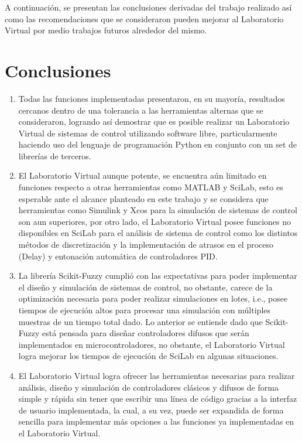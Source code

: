 A continuación, se presentan las conclusiones derivadas del trabajo realizado así como las recomendaciones que se consideraron pueden mejorar al Laboratorio Virtual por medio trabajos futuros alrededor del mismo.

\section{Conclusiones}

    \begin{enumerate}[leftmargin=15pt]
        \setlength\itemsep{10pt}    
        \item Todas las funciones implementadas presentaron, en su mayoría, resultados cercanos dentro de una tolerancia a las herramientas alternas que se consideraron, logrando así demostrar que es posible realizar un Laboratorio Virtual de sistemas de control utilizando software libre, particularmente haciendo uso del lenguaje de programación Python en conjunto con un set de librerías de terceros.
        
        \item El Laboratorio Virtual aunque potente, se encuentra aún limitado en funciones respecto a otras herramientas como MATLAB y SciLab, esto es esperable ante el alcance planteado en este trabajo y se considera que herramientas como Simulink y Xcos para la simulación de sistemas de control son aun superiores, por otro lado, el Laboratorio Virtual posee funciones no disponibles en SciLab para el análisis de sistema de control como los distintos métodos de discretización y la implementación de atrasos en el proceso (Delay) y entonación automática de controladores PID.
        
        \item La librería Scikit-Fuzzy cumplió con las expectativas para poder implementar el diseño y simulación de sistemas de control, no obstante, carece de la optimización necesaria para poder realizar simulaciones en lotes, i.e., posee tiempos de ejecución altos para procesar una simulación con múltiples muestras de un tiempo total dado. Lo anterior se entiende dado que Scikit-Fuzzy está pensada para diseñar controladores difusos que serán implementados en microcontroladores, no obstante, el Laboratorio Virtual logra mejorar los tiempos de ejecución de SciLab en algunas situaciones.
        
        \item El Laboratorio Virtual logra ofrecer las herramientas necesarias para realizar análisis, diseño y simulación de controladores clásicos y difusos de forma simple y rápida sin tener que escribir una línea de código gracias a la interfaz de usuario implementada, la cual, a su vez, puede ser expandida de forma sencilla para implementar más opciones a las funciones ya implementadas en el Laboratorio Virtual.
        

\end{enumerate}
